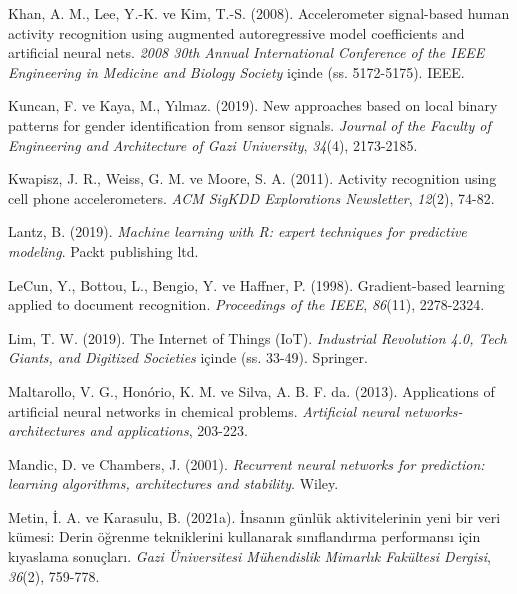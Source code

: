 \documentclass[12pt,twoside]{deuthesis}
\begin{document}
\begin{CSLReferences}{1}{0}
\leavevmode{}%
Khan, A. M., Lee, Y.-K. ve Kim, T.-S. (2008). Accelerometer signal-based human activity recognition using augmented autoregressive model coefficients and artificial neural nets. \emph{2008 30th Annual International Conference of the IEEE Engineering in Medicine and Biology Society} içinde (ss. 5172-5175). IEEE.

\leavevmode{}%
Kuncan, F. ve Kaya, M., Yılmaz. (2019). New approaches based on local binary patterns for gender identification from sensor signals. \emph{Journal of the Faculty of Engineering and Architecture of Gazi University}, \emph{34}(4), 2173-2185.

\leavevmode{}%
Kwapisz, J. R., Weiss, G. M. ve Moore, S. A. (2011). Activity recognition using cell phone accelerometers. \emph{ACM SigKDD Explorations Newsletter}, \emph{12}(2), 74-82.

\leavevmode{}%
Lantz, B. (2019). \emph{Machine learning with R: expert techniques for predictive modeling}. Packt publishing ltd.

\leavevmode{}%
LeCun, Y., Bottou, L., Bengio, Y. ve Haffner, P. (1998). Gradient-based learning applied to document recognition. \emph{Proceedings of the IEEE}, \emph{86}(11), 2278-2324.

\leavevmode{}%
Lim, T. W. (2019). The Internet of Things (IoT). \emph{Industrial Revolution 4.0, Tech Giants, and Digitized Societies} içinde (ss. 33-49). Springer.

\leavevmode{}%
Maltarollo, V. G., Honório, K. M. ve Silva, A. B. F. da. (2013). Applications of artificial neural networks in chemical problems. \emph{Artificial neural networks-architectures and applications}, 203-223.

\leavevmode{}%
Mandic, D. ve Chambers, J. (2001). \emph{Recurrent neural networks for prediction: learning algorithms, architectures and stability}. Wiley.

\leavevmode{}%
Metin, İ. A. ve Karasulu, B. (2021a). {İ}nsan{ı}n g{ü}nl{ü}k aktivitelerinin yeni bir veri k{ü}mesi: Derin {ö}{ğ}renme tekniklerini kullanarak s{ı}n{ı}fland{ı}rma performans{ı} i{ç}in k{ı}yaslama sonu{ç}lar{ı}. \emph{Gazi {Ü}niversitesi M{ü}hendislik Mimarl{ı}k Fak{ü}ltesi Dergisi}, \emph{36}(2), 759-778.


\end{CSLReferences}
\end{document}
